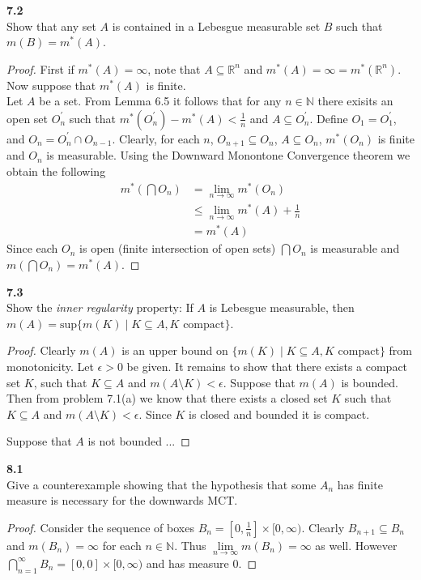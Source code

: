 \documentclass[12pt]{article}
\newcommand{\problem}[1]{\hspace{-4 ex} \large \textbf{#1}\\}
\begin{document}
\problem{7.2} Show that any set $A$ is contained in a Lebesgue measurable set $B$ such that $m(B)=m^*(A)$.

	\begin{proof}
		First if $m^*(A) = \infty$, note that $A \subseteq \mathbb{R}^n$ and $m^*(A) = \infty = m^*(\mathbb{R}^n)$. Now suppose that $m^*(A)$ is finite. \\
		Let $A$ be a set. From Lemma 6.5 it follows that for any $n \in \mathbb{N}$ there exisits an open set $O_n^\prime$ such that $m^*(O_n^\prime) - m^*(A) < \tfrac{1}{n}$ and $A \subseteq O_n^\prime$. Define $O_1 = O_1^\prime$, and $O_n = O_{n}^\prime \cap O_{n-1}$. Clearly, for each $n$, $O_{n+1} \subseteq O_n$, $A \subseteq O_n$, $m^*(O_n)$ is finite and $O_n$ is measurable. Using the Downward Monontone Convergence theorem we obtain the following
		\begin{align*}
			m^*(\bigcap O_n) & = \lim_{n \to \infty} m^*(O_n) \\
			& \leq \lim_{n \to \infty} m^*(A) + \tfrac{1}{n} \\
			& = m^*(A)
		\end{align*}
		Since each $O_n$ is open (finite intersection of open sets) $\bigcap O_n$ is measurable and $m(\bigcap O_n) = m^*(A)$.
	\end{proof}

\problem{7.3} Show the \emph{inner regularity} property: If $A$ is Lebesgue measurable, then $m(A)=\text{sup}\{m(K)\mid K\subseteq A, K\text{ compact}\}$.

	\begin{proof}
		Clearly $m(A)$ is an upper bound on $\{m(K)\mid K\subseteq A, K\text{ compact}\}$ from monotonicity. Let $\epsilon >0$ be given. It remains to show that there exists a compact set $K$, such that $K \subseteq A$ and $m(A \setminus K) < \epsilon$. \bigbreak
		Suppose that $m(A)$ is bounded. Then from problem 7.1(a) we know that there exists a closed set $K$ such that $K \subseteq A$ and $m(A \setminus K) < \epsilon$. Since $K$ is closed and bounded it is compact. \bigbreak
		
		Suppose that $A$ is not bounded ...
	\end{proof}

\problem{8.1} Give a counterexample showing that the hypothesis that some $A_n$ has finite measure is necessary for the downwards MCT.

	\begin{proof}
		Consider the sequence of boxes $B_n = [0,\tfrac{1}{n}] \times [0, \infty)$. Clearly $B_{n+1} \subseteq B_n$ and $m(B_n)=\infty$ for each $n \in \mathbb{N}$. Thus $\lim\limits_{n \to \infty}m(B_n) = \infty$ as well. However $\bigcap\limits_{n=1}^{\infty}B_n = [0,0] \times [0,\infty)$ and has measure $0$.
	\end{proof}
\end{document}
